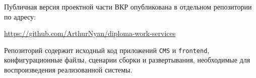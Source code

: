 \noindent Публичная версия проектной части ВКР опубликована в отдельном репозитории по
адресу:

\begin{center}
  \url{https://github.com/ArthurNyan/diploma-work-services}
\end{center}

\noindent Репозиторий содержит исходный код приложений \texttt{CMS} и
\texttt{frontend}, конфигурационные файлы, сценарии сборки и развертывания, необходимые
для воспроизведения реализованной системы.
